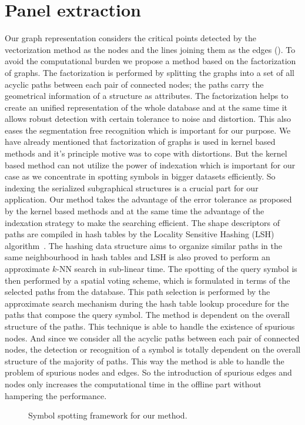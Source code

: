 \section{Panel extraction}
\label{sec:hssg:meth}
Our graph representation considers the critical points detected by the vectorization method as the nodes and the lines joining them as the edges (). To avoid the computational burden we propose a method based on the factorization of graphs. The factorization is performed by splitting the graphs into a set of all acyclic paths between each pair of connected nodes; the paths carry the geometrical information of a structure as attributes. The factorization helps to create an unified representation of the whole database and at the same time it allows robust detection with certain tolerance to noise and distortion. This also eases the segmentation free recognition which is important for our purpose. We have already mentioned that factorization of graphs is used in kernel based methods and it's principle motive was to cope with distortions. But the kernel based method can not utilize the power of indexation which is important for our case as we concentrate in spotting symbols in bigger datasets efficiently. So indexing the serialized subgraphical structures is a crucial part for our application. Our method takes the advantage of the error tolerance as proposed by the kernel based methods and at the same time the advantage of the indexation strategy to make the searching efficient. The shape descriptors of paths are compiled in hash tables by the Locality Sensitive Hashing (LSH) algorithm~\cite{Indyk1998,Gionis1999}. The hashing data structure aims to organize similar paths in the same neighbourhood in hash tables and LSH is also proved to perform an approximate $k$-NN search in sub-linear time. The spotting of the query symbol is then performed by a spatial voting scheme, which is formulated in terms of the selected paths from the database. This path selection is performed by the approximate search mechanism during the hash table lookup procedure for the paths that compose the query symbol. The method is dependent on the overall structure of the paths. This technique is able to handle the existence of spurious nodes. And since we consider all the acyclic paths between each pair of connected nodes, the detection or recognition of a symbol is totally dependent on the overall structure of the majority of paths. This way the method is able to handle the problem of spurious nodes and edges. So the introduction of spurious edges and nodes only increases the computational time in the offline part without hampering the performance.
\begin{figure*}[t]
\centering{}
\caption{Symbol spotting framework for our method.}
\label{fig:hssg:spotframework}
\end{figure*}

